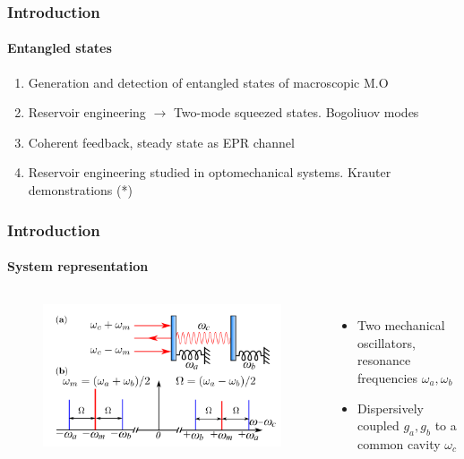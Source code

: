 \documentclass[aspectratio=43]{beamer}
\begin{document}
\begin{frame}

	\frametitle{Introduction}
	\framesubtitle{Entangled states}

	\begin{enumerate}
		\item Generation and detection of entangled states of macroscopic M.O
		\item Reservoir engineering $\longrightarrow$ Two-mode squeezed states. Bogoliuov modes
		\item Coherent feedback, steady state as EPR channel 
		\item Reservoir engineering studied in optomechanical systems. Krauter demonstrations (*)
	\end{enumerate}	
	
\end{frame}

\begin{frame}

	\frametitle{Introduction}
	\framesubtitle{System representation}
	
	\begin{columns}
		
		
		\begin{figure}
			\includegraphics[width = 7 cm]{plots/plot_system.png}
		\end{figure}	


		\begin{itemize}
			\item Two mechanical oscillators, resonance frequencies $\omega_{a}, \omega_{b}$
			\item Dispersively coupled $g_{a}, g_{b}$ to a common cavity $\omega_{c}$
		\end{itemize}

	\end{columns}

\end{frame}
\end{document}
